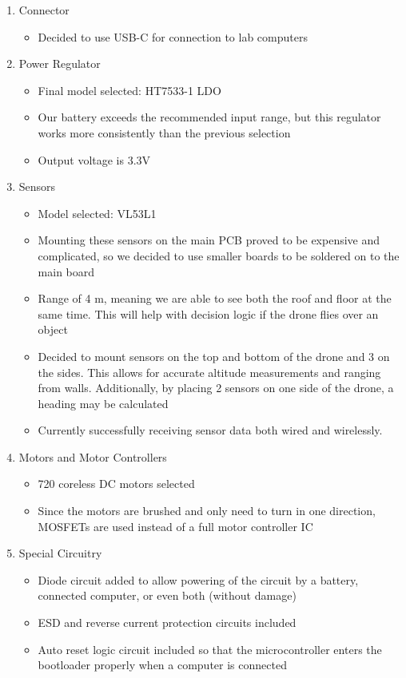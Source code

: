 \documentclass[12pt, titlepage]{article}
\begin{document}
\begin{enumerate}
\item Connector
\begin{itemize}
\item Decided to use USB-C for connection to lab computers
\end{itemize}

\item Power Regulator
\begin{itemize}
\item Final model selected: HT7533-1 LDO
\item Our battery exceeds the recommended input range, but this regulator works more consistently than the previous selection
\item Output voltage is 3.3V
\end{itemize}

\item Sensors
\begin{itemize}
\item Model selected: VL53L1
\item Mounting these sensors on the main PCB proved to be expensive and complicated, so we decided to use smaller boards to be soldered on to the main board
\item Range of 4 m, meaning we are able to see both the roof and floor at the same time. This will help with decision logic if the drone flies over an object
\item Decided to mount sensors on the top and bottom of the drone and 3 on the sides. This allows for accurate altitude measurements and ranging from walls. Additionally, by placing 2 sensors on one side of the drone, a heading may be calculated
\item Currently successfully receiving sensor data both wired and wirelessly.
\end{itemize}

\item Motors and Motor Controllers
\begin{itemize}
\item 720 coreless DC motors selected
\item Since the motors are brushed and only need to turn in one direction, MOSFETs are used instead of a full motor controller IC
\end{itemize}

\item Special Circuitry
\begin{itemize}
\item Diode circuit added to allow powering of the circuit by a battery, connected computer, or even both (without damage)
\item ESD and reverse current protection circuits included
\item Auto reset logic circuit included so that the microcontroller enters the bootloader properly when a computer is connected
\end{itemize}


\end{enumerate}
\end{document}
